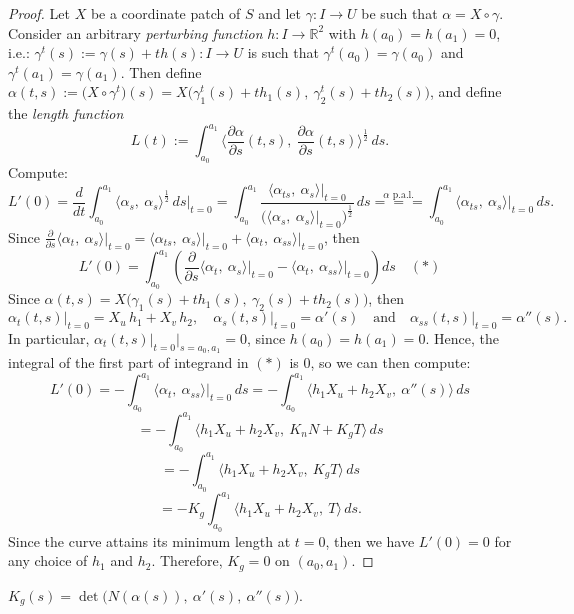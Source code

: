 \begin{proof}
Let $X$ be a coordinate patch of $S$ and let $\gamma: I\to U$ be such that $\alpha = X\circ\gamma$. Consider an arbitrary \textit{perturbing function} $h: I\to\mathbb{R}^2$ with $h(a_0) = h(a_1) = 0$, i.e.: $\gamma^t(s) := \gamma(s) + th(s): I\to U$ is such that $\gamma^t(a_0) = \gamma(a_0)$ and $\gamma^t(a_1) = \gamma(a_1)$. Then define $\alpha(t, s) := \big(X\circ\gamma^t\big)(s) = X\big(\gamma_1^t(s) + th_1(s),\ \gamma_2^t(s) + th_2(s)\big)$, and define the \textit{length function}
\[
L(t) := \int_{a_0}^{a_1}\Big\langle\frac{\partial\alpha}{\partial s}(t, s),\ \frac{\partial\alpha}{\partial s}(t, s)\Big\rangle^{\frac{1}{2}}\,ds.
\]
Compute:
\[
L'(0) = \frac{d}{dt}\int_{a_0}^{a_1}\langle\alpha_s,\ \alpha_s\rangle^{\frac{1}{2}}\,ds\Bigg|_{t = 0} = \int_{a_0}^{a_1}\frac{\langle\alpha_{ts},\ \alpha_s\rangle\big|_{t = 0}}{\Big(\langle\alpha_s,\ \alpha_s\rangle\big|_{t = 0}\Big)^{\frac{1}{2}}}\,ds \stackrel{\alpha\text{ p.a.l.}}{=\!=\!=} \int_{a_0}^{a_1}\langle\alpha_{ts},\ \alpha_s\rangle\Big|_{t = 0}\,ds.
\]
Since $\frac{\partial}{\partial s}\langle\alpha_t,\ \alpha_s\rangle\Big|_{t = 0} = \langle\alpha_{ts},\ \alpha_s\rangle\big|_{t = 0} + \langle\alpha_t,\ \alpha_{ss}\rangle\big|_{t = 0}$, then
\[
L'(0) = \int_{a_0}^{a_1}\left(\frac{\partial}{\partial s}\langle\alpha_t,\ \alpha_s\rangle\Big|_{t = 0} - \langle\alpha_t,\ \alpha_{ss}\rangle\Big|_{t = 0}\right)ds \quad (*)
\]
Since $\alpha(t, s) = X\big(\gamma_1(s) + th_1(s),\ \gamma_2(s) + th_2(s)\big)$, then
\[
\alpha_t(t, s)\Big|_{t = 0} = X_u\,h_1 + X_v\,h_2, \quad \alpha_s(t, s)\big|_{t = 0} = \alpha'(s) \quad\text{and}\quad \alpha_{ss}(t, s)\big|_{t = 0} = \alpha''(s).
\]
In particular, $\alpha_t(t, s)\big|_{t = 0}\big|_{s = a_0, a_1} = 0$, since $h(a_0) = h(a_1) = 0$. Hence, the integral of the first part of integrand in $(*)$ is 0, so we can then compute:
\[
L'(0) = -\int_{a_0}^{a_1}\langle\alpha_t,\ \alpha_{ss}\rangle\Big|_{t = 0}\,ds = -\int_{a_0}^{a_1}\big\langle h_1X_u + h_2X_v,\ \alpha''(s)\big\rangle\,ds
\]
\[
= -\int_{a_0}^{a_1}\big\langle h_1X_u + h_2X_v,\ K_nN + K_gT\big\rangle\,ds
\]
\[
= -\int_{a_0}^{a_1}\big\langle h_1X_u + h_2X_v,\ K_gT\big\rangle\,ds
\]
\[
= -K_g\int_{a_0}^{a_1}\big\langle h_1X_u + h_2X_v,\ T\big\rangle\,ds.
\]
Since the curve attains its minimum length at $t = 0$, then we have $L'(0) = 0$ for any choice of $h_1$ and $h_2$. Therefore, $K_g = 0$ on $(a_0, a_1)$.
\end{proof}

\begin{lemma}
$K_g(s) = \det\big(N(\alpha(s)),\ \alpha'(s),\ \alpha''(s)\big)$.
\end{lemma}

